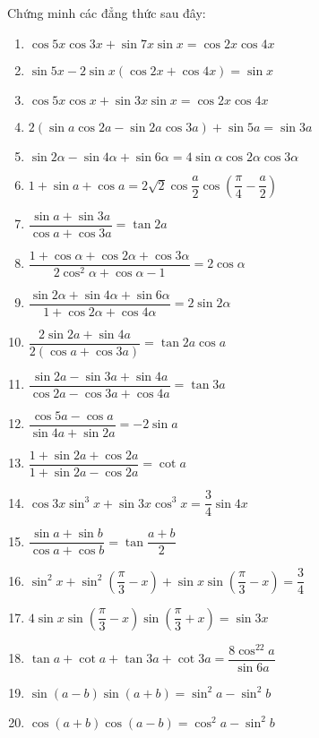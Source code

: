 \begin{bt}%
	Chứng minh các đẳng thức sau đây:
	\begin{multicols}{2}
		\begin{enumerate}
			\item $\cos 5x\cos 3x+\sin 7x\sin x=\cos 2x\cos 4x$
			\item $\sin 5x-2\sin x(\cos 2x+\cos 4x)=\sin x$
			\item $\cos 5x\cos x+\sin 3x\sin x=\cos 2x\cos 4x$
			\item $2(\sin a\cos 2a-\sin 2a\cos 3a)+\sin 5a=\sin 3a$
			\item $\sin 2\alpha -\sin 4\alpha +\sin 6\alpha =4\sin \alpha \cos 2\alpha \cos 3\alpha $
			\item $1+\sin a+\cos a=2\sqrt{2}\cos \dfrac{a}{2}\cos \left(\dfrac{\pi}{4}-\dfrac{a}{2}\right)$
			\item $\dfrac{\sin a+\sin 3a}{\cos a+\cos 3a}=\tan 2a$
			\item $\dfrac{1+\cos \alpha +\cos 2\alpha +\cos 3\alpha}{2\cos^2\alpha +\cos \alpha -1}=2\cos \alpha $
			\item $\dfrac{\sin 2\alpha +\sin 4\alpha +\sin 6\alpha}{1+\cos 2\alpha +\cos 4\alpha}=2\sin 2\alpha $
			\item $\dfrac{2\sin 2a+\sin 4a}{2(\cos a+\cos 3a)}=\tan 2a\cos a$
			\item $\dfrac{\sin 2a-\sin 3a+\sin 4a}{\cos 2a-\cos 3a+\cos 4a}=\tan 3a$
			\item $\dfrac{\cos 5a-\cos a}{\sin 4a+\sin 2a}=-2\sin a$
			\item $\dfrac{1+\sin 2a+\cos 2a}{1+\sin 2a-\cos 2a}=\cot a$
			\item $\cos 3x\sin^3x+\sin 3x\cos^3x=\dfrac{3}{4}\sin 4x$
			\item $\dfrac{\sin a+\sin b}{\cos a+\cos b}=\tan \dfrac{a+b}{2}$
			\item $\sin^2x+\sin^2\left(\dfrac{\pi}{3}-x\right)+\sin x\sin \left(\dfrac{\pi}{3}-x\right)=\dfrac{3}{4}$
			\item $4\sin x\sin \left(\dfrac{\pi}{3}-x\right)\sin \left(\dfrac{\pi}{3}+x\right)=\sin 3x$
			\item $\tan a+\cot a+\tan 3a+\cot 3a=\dfrac{8\cos^22a}{\sin 6a}$
			\item $\sin (a-b)\sin (a+b)=\sin^2a-\sin^2b$
			\item $\cos (a+b)\cos (a-b)=\cos^2a-\sin^2b$
		\end{enumerate}
	\end{multicols}
	\loigiai{
}
\end{bt}
